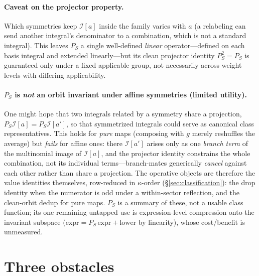 \documentclass[11pt]{article}
\newcommand{\I}[1]{\mathcal{I}[#1]}
\newcommand{\kk}{\kappa}
\begin{document}
\paragraph{Caveat on the projector property.}
Which symmetries keep $\I{a}$ inside the family varies with $a$ (a relabeling can send
another integral's denominator to a combination, which is not a standard integral). This
leaves $P_S$ a single well-defined \emph{linear} operator---defined on each basis
integral and extended linearly---but its clean projector identity $P_S^2=P_S$ is
guaranteed only under a fixed applicable group, not necessarily across weight levels with
differing applicability.

\paragraph{$P_S$ is \emph{not} an orbit invariant under affine symmetries (limited
utility).} One might hope that two integrals related by a symmetry share a projection,
$P_S\I{a}=P_S\I{a'}$, so that symmetrized integrals could serve as canonical class
representatives. This holds for \emph{pure} maps (composing with $g$ merely reshuffles
the average) but \emph{fails} for affine ones: there $\I{a'}$ arises only as one
\emph{branch term} of the multinomial image of $\I{a}$, and the projector identity
constrains the whole combination, not its individual terms---branch-mates generically
\emph{cancel} against each other rather than share a projection. The operative objects
are therefore the value identities themselves, row-reduced in $\kk$-order
(\S\ref{sec:classification}): the drop identity when the numerator is odd under a
within-sector reflection, and the clean-orbit dedup for pure maps. $P_S$ is a summary of
these, not a usable class function; its one remaining untapped use is expression-level
compression onto the invariant subspace ($\text{expr}=P_S\,\text{expr}+\text{lower}$ by
linearity), whose cost/benefit is unmeasured.

\section{Three obstacles}
\end{document}
